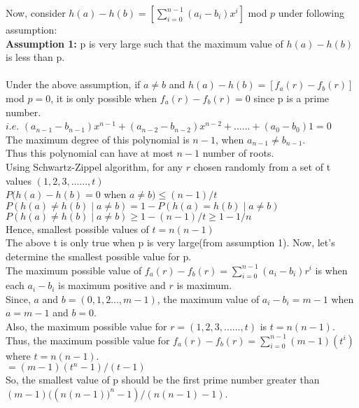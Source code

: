 \documentclass[11pt]{article}
\begin{document}
Now, consider $h(a) - h(b) = [\sum_{i=0}^{n-1} (a_i-b_i) x^i]$ mod $p$ under following assumption: \\
\textbf{Assumption 1:} p  is very large such that the maximum value of $h(a) - h(b)$ is less than p.\\
\\
Under the above assumption, if $ a \neq b$ and $h(a) - h(b) = [f_a(r) - f_b(r)]$ mod $p= 0$, it is only possible when
$f_a(r) - f_b(r) = 0$ since p is a prime number. \\
$i.e.$ $(a_{n-1} - b_{n-1}) x^{n-1} + (a_{n-2} - b_{n-2}) x^{n-2} + ......+ (a_0 - b_0)1 = 0$ \\
The maximum degree of this polynomial is $n-1$, when $a_{n-1} \neq b_{n-1}$.\\
Thus this polynomial can have at most $n-1$ number of roots. \\
Using Schwartz-Zippel algorithm, for any $r$ chosen randomly from a set of t values $(1,2,3,......,t)$ \\
$P(h(a) - h(b) = 0$ when $a \neq b) \leq (n-1)/t$ \\
$P(h(a) \neq h(b) \mid a \neq b) = 1 - P(h(a) = h(b) \mid a \neq b)$ \\
$P(h(a) \neq h(b) \mid a \neq b) \geq 1- (n-1)/t  \geq 1 - 1/n$ \\
Hence, smallest possible values of $t = n(n-1)$ \\

The above t is only true when p is very large(from assumption 1). Now, let's determine the smallest possible value for p.\\
The maximum possible value of $f_a(r) - f_b(r) = \sum_{i=0}^{n-1} (a_i-b_i) r^i$ is when each $a_i - b_i$ is maximum positive and
$r$ is maximum. \\
Since, $a$ and $b = (0,1,2...,m-1)$, the maximum value of $a_i - b_i = m-1$ when $a = m-1$ and $b= 0$.\\
Also, the maximum possible value for $r = (1,2,3,......,t)$ is $t = n(n-1)$. \\
Thus, the maximum possible value for  $f_a(r) - f_b(r) = \sum_{i=0}^{n-1} (m-1)(t^i)$ where $t = n(n-1)$.\\
$ = (m-1)(t^n - 1)/(t-1)$ \\
So, the smallest value of p should be the first prime number greater than\\ $(m-1)(({n(n-1))}^n - 1)/(n(n-1)-1)$.
\end{document}
